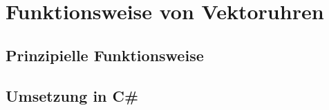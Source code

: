 \section{Funktionsweise von Vektoruhren}
\subsection{Prinzipielle Funktionsweise}
\subsection{Umsetzung in C\#}
